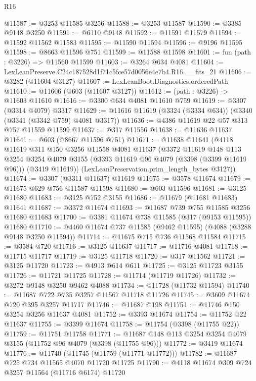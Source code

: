 \begin{lexlean}{R16}
\begin{coremodule}
@11587 := @3253 @11585 @3256
@11588 := @3253 @11587
@11590 := @3385 @9148 @3250
@11591 := @6110 @9148
@11592 := @11591 @11579
@11594 := @11592 @11562 @11583
@11595 := @11590 @11594
@11596 := @9196 @11595
@11598 := @8663 @11596 @751
@11599 := @11588 @11598
@11601 := fun (path : @3226) => @11560 @11599
@11603 := @3264 @634 @4081
@11604 := LexLeanPreserve.C24c187528d1f71c5fce57d0056e4e7b4.R16.__fits_21
@11606 := @3282 (@11604 @3127)
@11607 := LexLeanBoot.Diagnostics.orderedPath
@11610 := @11606 (@603 (@11607 @3127))
@11612 := (path : @3226) -> @11603 @11610
@11616 := @3300 @634 @4081 @11610 @759
@11619 := @3307 (@3314 @4079) @3317
@11629 := @11616 @11619 (@3324 (@3334 @634)) (@3340 (@3341 (@3342 @759) @4081 @3317))
@11636 := @4386 @11619 @22 @57 @313 @757 @11559 @11599
@11637 := @317 @11556
@11638 := @11636 @11637
@11641 := @603 (@8667 @11596 @751)
@11671 := @11638
    @11641
    (@4118
      @11619
      @311
      @150
      @3256
      @11558
      @4081
      @11637
      (@3372
        @11619
        @148
        @113
        @3254
        @3254
        @4079
        @3155
        (@3393 @11619 @96 @4079 (@3398 (@3399 @11619 @96)))
        (@3419 @11619))
      (LexLeanPreservation.prim_length_bytes @3127))
@11674 := @3307 (@3311 @11637) @11619
@11675 := @3578 @11674
@11679 := @11675 @629 @756 @11587 @11598
@11680 := @603 @11596
@11681 := @3125 @11680
@11683 := @3125 @752 @3155
@11686 := @11679 (@11681 @11683) @11641
@11687 := @3372 @11674
@11693 := @11687 @739 @755 @11585 @3256 @11680 @11683
@11700 := @3381 @11674 @738 @11585 (@317 (@9153 @11595)) @11680
@11710 := @4460 @11674 @737 @11585 (@9462 @11595) (@4088 (@3288 @9148 @3250 @11594))
@11714 := @11675 @715 @736 @11568 @11584
@11715 := @3584 @720
@11716 := @3125 @11637
@11717 := @11716 @4081
@11718 := @11715 @11717
@11719 := @3125 @11718
@11720 := @317 @11562
@11721 := @3125 @11720
@11723 := @4913 @614 @611
@11725 := @3125 @11723 @3155
@11726 := @11721 @11725
@11728 := @11714 (@11719 @11726)
@11732 := @3272 @9148 @3250 @9462 @4088
@11734 := @11728 (@11732 @11594)
@11740 := @11687 @722 @735 @3257 @11567 @11718 @11726
@11745 := @3609 @11674 @720 @395 @3257 @11717
@11746 := @11687 @198
@11751 := @11746 @150 @3254 @3256 @11637 @4081
@11752 := @3393 @11674
@11754 := @11752 @22 @11637
@11755 := @3399 @11674
@11758 := @11754 (@3398 (@11755 @22))
@11759 := @11751 @11758
@11771 := @11687 @148 @113 @3254 @3254 @4079 @3155 (@11752 @96 @4079 (@3398 (@11755 @96)))
@11772 := @3419 @11674
@11776 := @11740 (@11745 (@11759 (@11771 @11772)))
@11782 := @11687 @725 @734 @11565 @4070 @11720 @11725
@11790 := @4118 @11674 @309 @724 @3257 @11564 (@11716 @6174) @11720

\end{coremodule}
\end{lexlean}
